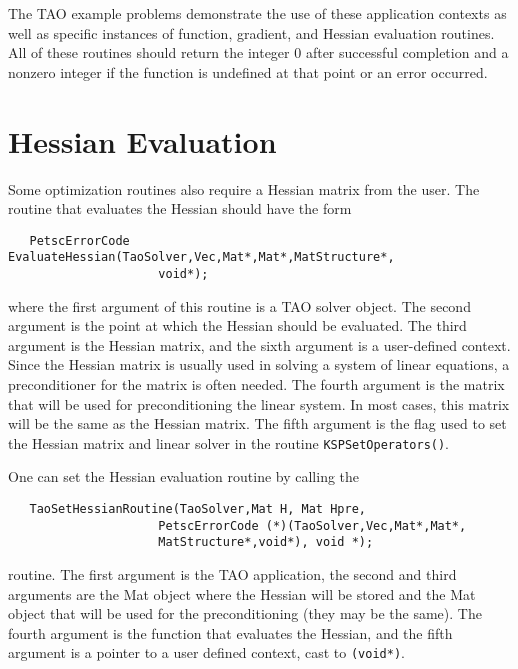 The TAO example problems demonstrate the use of these application contexts
as well as specific instances of function, gradient, and Hessian 
evaluation routines.
All of these routines should return the integer $0$ after 
successful completion and a nonzero integer if the function
is undefined at that point or an error occurred.

\section{Hessian Evaluation}
\label{sec:matrixfree}
\label{sec:finitedifference}

Some optimization routines also require a Hessian matrix from the user.
The routine that evaluates the Hessian should have the form 
\begin{verbatim}
   PetscErrorCode EvaluateHessian(TaoSolver,Vec,Mat*,Mat*,MatStructure*,
                     void*);
\end{verbatim}
where the first argument of this routine is a TAO solver object.  The
second
argument is the point at which the Hessian should be evaluated.  The
third argument is the Hessian matrix, and the sixth argument is a
user-defined context.
Since the Hessian matrix is usually used in solving
a system of linear equations, a preconditioner for the matrix is often
needed.  The fourth argument is the matrix that will be used
for preconditioning the linear system.  In most cases, this
matrix will be the same as the Hessian matrix.  The fifth
argument is the flag used to set the Hessian matrix and
linear solver in the routine {\tt KSPSetOperators()}.

One can set the Hessian evaluation routine by calling the 
\begin{verbatim}
   TaoSetHessianRoutine(TaoSolver,Mat H, Mat Hpre,
                     PetscErrorCode (*)(TaoSolver,Vec,Mat*,Mat*,
                     MatStructure*,void*), void *);
\end{verbatim}
routine. 
The first argument is the TAO application, the second and third arguments
are the Mat object where the Hessian will be stored and the Mat object
that will be used for the preconditioning (they may be the same). The fourth 
argument is the function that evaluates the Hessian, 
and the fifth argument is a pointer to a user defined context,
cast to {\tt (void*)}.

